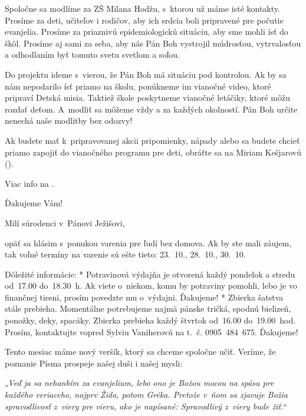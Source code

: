 Spoločne sa modlíme za ZŠ Milana Hodžu, s~ktorou už máme isté kontakty. Prosíme za deti, učiteľov i rodičov, aby ich srdcia boli pripravené pre počutie evanjelia. Prosíme za priaznivú epidemiologickú situáciu, aby sme mohli ísť do škôl. Prosíme aj sami za seba, aby nás Pán Boh vystrojil múdrosťou, vytrvalosťou a odhodlaním byť tomuto svetu svetlom a soľou.

Do projektu ideme s~vierou, že Pán Boh má situáciu pod kontrolou. Ak by sa nám nepodarilo ísť priamo na školu, ponúkneme im vianočné video, ktoré pripraví Detská misia. Taktiež škole poskytneme vianočné letáčiky, ktoré môžu rozdať deťom. A~modliť sa môžeme vždy a za každých okolností. Pán Boh určite nenechá naše modlitby bez odozvy!

Ak budete mať k~pripravovanej akcii pripomienky, nápady alebo sa budete chcieť priamo zapojiť do vianočného programu pre deti, obráťte sa na Miriam Kešjarovú ().

Viac info na .

Ďakujeme Vám!


Milí súrodenci v~Pánovi Ježišovi,

opäť sa hlásim s~ponukou varenia pre ľudí bez domova. Ak by ste mali záujem, tak voľné termíny na varenie sú ešte tieto: 23.~10., 28.~10., 30.~10.

Dôležité informácie:
\begitems
* Potravinová výdajňa je otvorená každý pondelok a stredu od~17.00 do~18.30~h. Ak viete o~niekom, komu by potraviny pomohli, lebo je vo finančnej tiesni, prosím povedzte mu o~výdajni. Ďakujeme!
* Zbierka šatstva stále prebieha. Momentálne potrebujeme najmä pánske tričká, spodnú bielizeň, ponožky, deky, spacáky. Zbierka prebieha každý štvrtok od~16.00 do~19.00~hod. Prosím, kontaktujte vopred Sylviu Vaniherovú na t.~č. 0905~484~675. Ďakujeme!
\enditems

\vfill\break


Tento mesiac máme nový veršík, ktorý sa chceme spoločne učiť. Veríme, že poznanie Písma prospeje našej duši i našej mysli:

{\it „Veď ja sa nehanbím za evanjelium, lebo ono je Božou mocou na spásu pre každého veriaceho, najprv Žida, potom Gréka. Pretože v~ňom sa zjavuje Božia spravodlivosť z~viery pre vieru, ako je napísané: Spravodlivý z~viery bude žiť.“}



